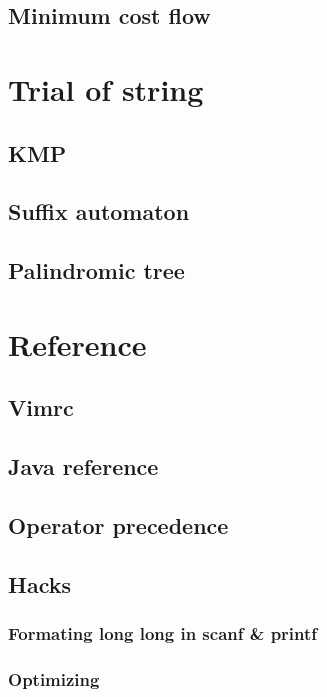 \documentclass[UTF8,a4paper]{report}
\begin{document}
		\section{Minimum cost flow}
			
	\chapter{Trial of string}
		\section{KMP}
			
		\section{Suffix automaton}
			
		\section{Palindromic tree}
			
	\chapter{Reference}
		\section{Vimrc}
			
		\section{Java reference}
			
		\section{Operator precedence}
			
		\section{Hacks}
			\subsection{Formating long long in scanf \& printf}
				
			\subsection{Optimizing}
				
\end{document}
